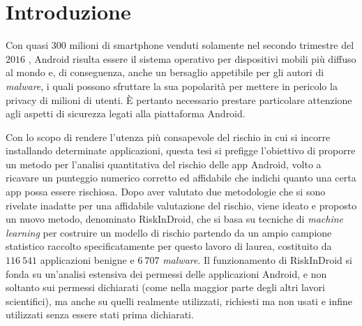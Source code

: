 \documentclass[12pt,a4paper,oneside]{article}
\begin{document}
\begin{spacing}{1.6}
\printglossary[type=\acronymtype,title={Simboli e abbreviazioni}]
\end{spacing}
\newpage



\tableofcontents
\newpage

\listoffigures
\newpage
\listoftables
\newpage





\section{Introduzione}\label{sec:Introduzione}

Con quasi $300$ milioni di smartphone venduti solamente nel secondo trimestre del $2016$ \cite{GARTNER}, Android risulta essere il sistema operativo per dispositivi mobili più diffuso al mondo e, di conseguenza, anche un bersaglio appetibile per gli autori di \textit{malware}, i quali possono sfruttare la sua popolarità per mettere in pericolo la privacy di milioni di utenti. È pertanto necessario prestare particolare attenzione agli aspetti di sicurezza legati alla piattaforma Android.

Con lo scopo di rendere l'utenza più consapevole del rischio in cui si incorre installando determinate applicazioni, questa tesi si prefigge l'obiettivo di proporre un metodo per l'analisi quantitativa del rischio delle app Android, volto a ricavare un punteggio numerico corretto ed affidabile che indichi quanto una certa app possa essere rischiosa. Dopo aver valutato due metodologie che si sono rivelate inadatte per una affidabile valutazione del rischio, viene ideato e proposto un nuovo metodo, denominato RiskInDroid, che si basa su tecniche di \textit{machine learning} per costruire un modello di rischio partendo da un ampio campione statistico raccolto specificatamente per questo lavoro di laurea, costituito da $116~541$ applicazioni benigne e $6~707$ \textit{malware}. Il funzionamento di RiskInDroid si fonda su un'analisi estensiva dei permessi delle applicazioni Android, e non soltanto sui permessi dichiarati (come nella maggior parte degli altri lavori scientifici), ma anche su quelli realmente utilizzati, richiesti ma non usati e infine utilizzati senza essere stati prima dichiarati.
\end{document}
